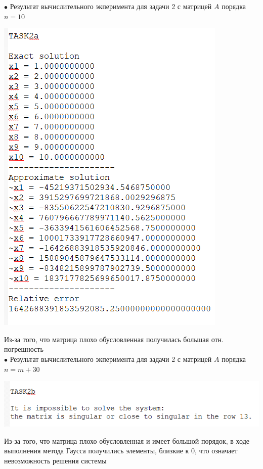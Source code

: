\documentclass[a4paper, 12pt]{report}
\begin{document}
   $\bullet$ Результат вычислительного экперимента для задачи 2 с матрицей $A$ порядка $n = 10$\\
   \begin{center}
       \includegraphics[scale = 0.5]{pic2.png}
   \end{center}
    Из-за того, что матрица плохо обусловленная получилась большая отн. погрешность\\
    $\bullet$ Результат вычислительного экперимента для задачи 2 с матрицей $A$ порядка $n = m + 30$\\
   \begin{center}
       \includegraphics[scale = 0.5]{pic3.png}
   \end{center}
    Из-за того, что матрица плохо обусловленная и имеет большой порядок, в ходе выполнения метода Гаусса получились элементы, близкие к 0, что означает невозможность решения системы\\
\end{document}
